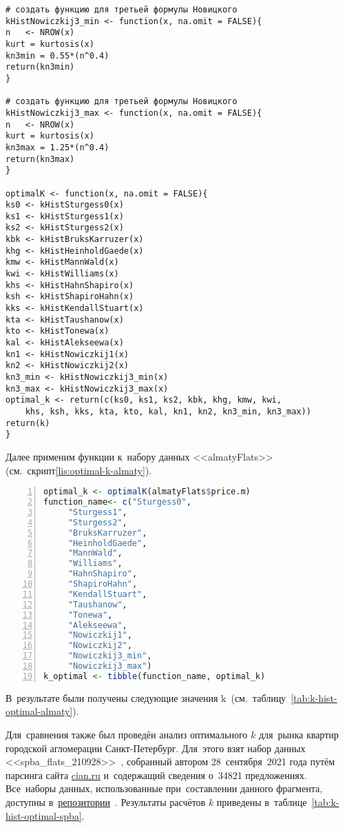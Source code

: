 \documentclass[]{scrartcl}
\begin{document}
\begin{lstlisting}
# создать функцию для третьей формулы Новицкого
kHistNowiczkij3_min <- function(x, na.omit = FALSE){ 
n   <- NROW(x)                                     
kurt = kurtosis(x)                                 
kn3min = 0.55*(n^0.4)                             
return(kn3min)                                    
}                                                   

# создать функцию для третьей формулы Новицкого
kHistNowiczkij3_max <- function(x, na.omit = FALSE){
n   <- NROW(x)                                   
kurt = kurtosis(x)                                
kn3max = 1.25*(n^0.4)                             
return(kn3max)                                    
}                                                   

optimalK <- function(x, na.omit = FALSE){ 
ks0 <- kHistSturgess0(x)
ks1 <- kHistSturgess1(x)
ks2 <- kHistSturgess2(x)
kbk <- kHistBruksKarruzer(x)
khg <- kHistHeinholdGaede(x)
kmw <- kHistMannWald(x)
kwi <- kHistWilliams(x)
khs <- kHistHahnShapiro(x) 
ksh <- kHistShapiroHahn(x)
kks <- kHistKendallStuart(x)
kta <- kHistTaushanow(x)
kto <- kHistTonewa(x)
kal <- kHistAlekseewa(x)
kn1 <- kHistNowiczkij1(x)
kn2 <- kHistNowiczkij2(x)
kn3_min <- kHistNowiczkij3_min(x)
kn3_max <- kHistNowiczkij3_max(x)
optimal_k <- return(c(ks0, ks1, ks2, kbk, khg, kmw, kwi,
	khs, ksh, kks, kta, kto, kal, kn1, kn2, kn3_min, kn3_max))
return(k)
}
\end{lstlisting}

Далее применим функции к~набору данных <<almatyFlats>> (см.~скрипт\ref{lis:optimal-k-almaty}).
\begin{lstlisting}[float, caption = Создание функций для~автоматизированного определения оптимального значения k, firstnumber=1, language = R, firstnumber=1, numbers=left, numberstyle=\tiny, stepnumber=2, numbersep=5pt, label= lis:optimal-k-almaty]
optimal_k <- optimalK(almatyFlats$price.m)  
function_name<- c("Sturgess0",
	 "Sturgess1",
	 "Sturgess2",
	 "BruksKarruzer",
	 "HeinholdGaede",
	 "MannWald",
	 "Williams",
	 "HahnShapiro",
	 "ShapiroHahn",
	 "KendallStuart",
	 "Taushanow",
	 "Tonewa",
	 "Alekseewa",
	 "Nowiczkij1",
	 "Nowiczkij2",
	 "Nowiczkij3_min",
	 "Nowiczkij3_max")
k_optimal <- tibble(function_name, optimal_k)
\end{lstlisting}

 В~результате были получены следующие значения k~(см.~таблицу~\ref{tab:k-hist-optimal-almaty}).
 
 Для~сравнения также был проведён анализ оптимального $k$ для~рынка квартир городской агломерации Санкт-Петербург. Для~этого взят набор данных <<spba\_flats\_210928>>~\cite{ds:spba-flats-210928}, собранный автором 28~сентября~2021 года путём парсинга сайта \href{cian.ru}{cian.ru} и~содержащий сведения о~34821 предложениях. Все~наборы данных, использованные при~составлении данного фрагмента, доступны в~\href{https://github.com/Kirill-Murashev/datasets}{репозитории}~\cite{R_source_github}. Результаты расчётов $k$ приведены в~таблице~\ref{tab:k-hist-optimal-spba}.
\end{document}
